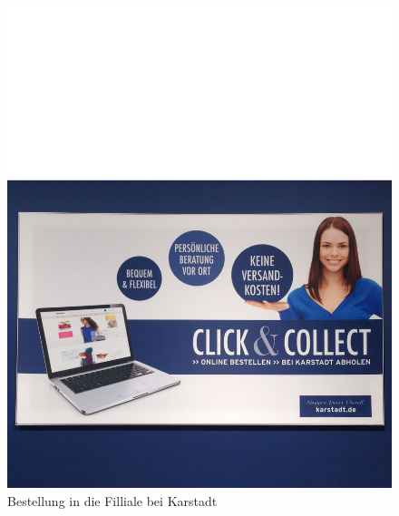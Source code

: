 \begin{minipage}[t]{0.4\textwidth}
\begin{figure}[H]
\begin{center}
\includegraphics[width=\textwidth]{Karstadt-Abholung.jpg}
\caption{Bestellung in die Filliale bei Karstadt}
\label{pic:karstadtab}
\end{center}
\end{figure}
\end{minipage}
\hfill
